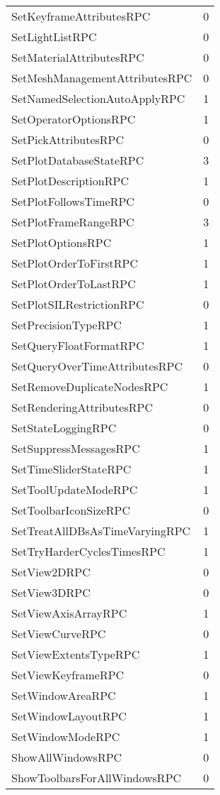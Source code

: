 \documentclass[10pt,a4paper]{report}
\begin{document}
\begin{longtable}{ll}
SetKeyframeAttributesRPC & 0 \\
SetLightListRPC & 0 \\
SetMaterialAttributesRPC & 0 \\
SetMeshManagementAttributesRPC & 0 \\
SetNamedSelectionAutoApplyRPC & 1 \\
SetOperatorOptionsRPC & 1 \\
SetPickAttributesRPC & 0 \\
SetPlotDatabaseStateRPC & 3 \\
SetPlotDescriptionRPC & 1 \\
SetPlotFollowsTimeRPC & 0 \\
SetPlotFrameRangeRPC & 3 \\
SetPlotOptionsRPC & 1 \\
SetPlotOrderToFirstRPC & 1 \\
SetPlotOrderToLastRPC & 1 \\
SetPlotSILRestrictionRPC & 0 \\
SetPrecisionTypeRPC & 1 \\
SetQueryFloatFormatRPC & 1 \\
SetQueryOverTimeAttributesRPC & 0 \\
SetRemoveDuplicateNodesRPC & 1 \\
SetRenderingAttributesRPC & 0 \\
SetStateLoggingRPC & 0 \\
SetSuppressMessagesRPC & 1 \\
SetTimeSliderStateRPC & 1 \\
SetToolUpdateModeRPC & 1 \\
SetToolbarIconSizeRPC & 0 \\
SetTreatAllDBsAsTimeVaryingRPC & 1 \\
SetTryHarderCyclesTimesRPC & 1 \\
SetView2DRPC & 0 \\
SetView3DRPC & 0 \\
SetViewAxisArrayRPC & 1 \\
SetViewCurveRPC & 0 \\
SetViewExtentsTypeRPC & 1 \\
SetViewKeyframeRPC & 0 \\
SetWindowAreaRPC & 1 \\
SetWindowLayoutRPC & 1 \\
SetWindowModeRPC & 1 \\
ShowAllWindowsRPC & 0 \\
ShowToolbarsForAllWindowsRPC & 0 \\

\end{longtable}
\end{document}
